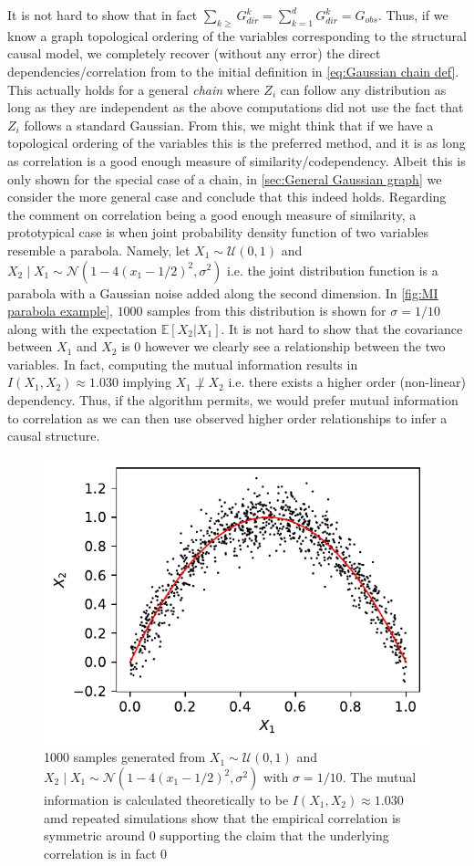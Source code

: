 \documentclass[../Thesis.tex]{subfiles}
\begin{document}
It is not hard to show that in fact $\sum_{k\geq} G_{dir}^k = \sum_{k=1}^d G_{dir}^k = G_{obs}$. Thus, if we know a graph topological ordering of the variables corresponding to the structural causal model, we completely recover (without any error) the direct dependencies/correlation from to the initial definition in \autoref{eq:Gaussian chain def}. This actually holds for a general \textit{chain} where $Z_i$ can follow any distribution as long as they are independent as the above computations did not use the fact that $Z_i$ follows a standard Gaussian. From this, we might think that if we have a topological ordering of the variables this is the preferred method, and it is as long as correlation is a good enough measure of similarity/codependency. Albeit this is only shown for the special case of a chain, in \autoref{sec:General Gaussian graph} we consider the more general case and conclude that this indeed holds. Regarding the comment on correlation being a good enough measure of similarity, a prototypical case is when joint probability density function of two variables resemble a parabola. Namely, let $X_1\sim \mathcal{U}\left(0,1\right)$ and $X_2 \mid X_1 \sim \mathcal{N}\left(1 - 4\left(x_1 - 1/2\right)^2 , \sigma^2\right)$ i.e. the joint distribution function is a parabola with a Gaussian noise added along the second dimension. In \autoref{fig:MI parabola example}, $1000$ samples from this distribution is shown for $\sigma = 1/10$ along with the expectation $\mathbb{E}\left[X_2 | X_1\right]$. It is not hard to show that the covariance between $X_1$ and $X_2$ is $0$ however we clearly see a relationship between the two variables. In fact, computing the mutual information results in $I\left(X_1,X_2\right) \approx 1.030$ implying $X_1 \not\perp X_2$ i.e. there exists a higher order (non-linear) dependency. Thus, if the algorithm permits, we would prefer mutual information to correlation as we can then use observed higher order relationships to infer a causal structure.
\begin{figure}[h]
    \centering
    \includegraphics[width=.7\linewidth]{figures/Mutual information figures/parabola example.pdf}
    \caption{1000 samples generated from $X_1\sim \mathcal{U}\left(0,1\right)$ and $X_2 \mid X_1 \sim \mathcal{N}\left(1 - 4\left(x_1 - 1/2\right)^2 , \sigma^2\right)$ with $\sigma = 1/10$. The mutual information is calculated theoretically to be $I\left(X_1,X_2\right) \approx 1.030$ amd repeated simulations show that the empirical correlation is symmetric around $0$ supporting the claim that the underlying correlation is in fact $0$} %
    \label{fig:MI parabola example}
\end{figure}
\end{document}
